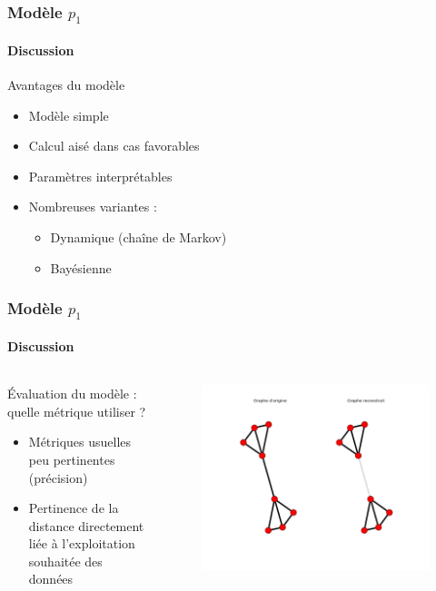 \documentclass[c]{beamer}
\begin{document}
\begin{frame}
    \frametitle{Modèle $p_1$}
    \framesubtitle{Discussion}

    Avantages du modèle
    \begin{itemize}
        \item Modèle simple
        \item Calcul aisé dans cas favorables
        \item Paramètres interprétables
        \item Nombreuses variantes :
            \begin{itemize}
                \item Dynamique (chaîne de Markov)
                \item Bayésienne
            \end{itemize}
    \end{itemize}
\end{frame}

\begin{frame}
    \frametitle{Modèle $p_1$}
    \framesubtitle{Discussion}

    \begin{columns}
        \begin{column}{.6\textwidth}
             \'Evaluation du modèle : quelle métrique utiliser ?
            \begin{itemize}
                \item Métriques usuelles peu pertinentes (précision)
                \item Pertinence de la distance directement liée à l'exploitation
                    souhaitée des données
            \end{itemize}
        \end{column}
        \begin{column}{.5\textwidth}
            \begin{figure}
                \includegraphics[width=.9\textwidth]{./figures/p1_distance.png}
            \end{figure}
        \end{column}
    \end{columns}

\end{frame}
\end{document}
